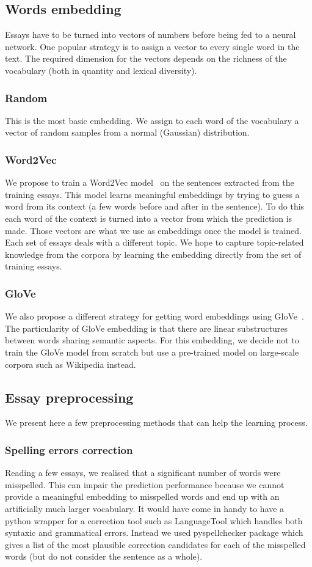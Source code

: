 \documentclass[a4paper,12pt,english]{article}
\begin{document}
\subsection{Words embedding}
Essays have to be turned into vectors of numbers before being fed to a neural network.
One popular strategy is to assign a vector to every single word in the text.
The required dimension for the vectors depends on the richness of the vocabulary (both in quantity and lexical diversity).
\subsubsection{Random}
This is the most basic embedding.
We assign to each word of the vocabulary a vector of random samples from a normal (Gaussian) distribution.
\subsubsection{Word2Vec}
We propose to train a Word2Vec model~\cite{mikolov2013efficient} on the sentences extracted from the training essays.
This model learns meaningful embeddings by trying to guess a word from its context (a few words before and after in the sentence).
To do this each word of the context is turned into a vector from which the prediction is made.
Those vectors are what we use as embeddings once the model is trained.
Each set of essays deals with a different topic.
We hope to capture topic-related knowledge from the corpora by learning the embedding directly from the set of training essays.
\subsubsection{GloVe}
We also propose a different strategy for getting word embeddings using GloVe~\cite{pennington2014glove}.
The particularity of GloVe embedding is that there are linear substructures between words sharing semantic aspects.
For this embedding, we decide not to train the GloVe model from scratch but use a pre-trained model on large-scale corpora such as Wikipedia instead.

\subsection{Essay preprocessing}
We present here a few preprocessing methods that can help the learning process.
\subsubsection{Spelling errors correction}
Reading a few essays, we realised that a significant number of words were misspelled.
This can impair the prediction performance because we cannot provide a meaningful embedding to misspelled words and end up with an artificially much larger vocabulary.
It would have come in handy to have a python wrapper for a correction tool such as LanguageTool which handles both syntaxic and grammatical errors.
Instead we used pyspellchecker package which gives a list of the most plausible correction candidates for each of the misspelled words (but do not consider the sentence as a whole).
\end{document}
